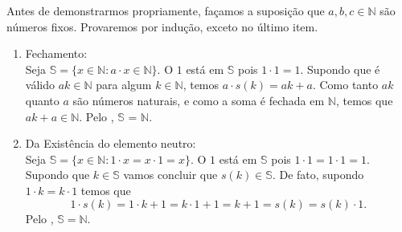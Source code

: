 \documentclass[../main.tex]{subfiles}
\begin{document}
\begin{dem}
    Antes de demonstrarmos propriamente, façamos a suposição que $a,b,c \in \mathbb{N}$ são números fixos. Provaremos por indução, exceto no último item.
    \begin{enumerate}[label=(\roman*)]
        \item Fechamento: \\
            Seja $\mathbb{S} = \{x \in \mathbb{N} : a \cdot x \in \mathbb{N} \}$.
            O $1$ está em $\mathbb{S}$ pois $1 \cdot 1 = 1$. Supondo que é válido $ak \in \mathbb{N}$ para algum $k \in \mathbb{N}$, temos $a \cdot s(k) = ak + a$. Como tanto $ak$ quanto $a$ são números naturais, e como a soma é fechada em $\mathbb{N}$, temos que $ak + a \in \mathbb{N}$. Pelo , $\mathbb{S}$ = $\mathbb{N}$. 
        \item Da Existência do elemento neutro: \\
            Seja $\mathbb{S} = \{ x \in \mathbb{N} : 1 \cdot x = x \cdot 1  = x \}$. O $1$ está em $\mathbb{S}$ pois $1 \cdot 1 = 1 \cdot 1 = 1$. Supondo que $k \in \mathbb{S}$ vamos concluir que $s(k) \in \mathbb{S}$.
            De fato, supondo $1 \cdot k = k \cdot 1$ temos que
            \[ 1 \cdot s(k) = 1 \cdot k + 1 = k \cdot 1 + 1 = k + 1 = s(k) = s(k) \cdot 1. \] 
            Pelo , $\mathbb{S} = \mathbb{N}$.
            

\end{enumerate}
\end{dem}
\end{document}
